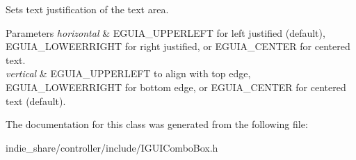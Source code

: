 Sets text justification of the text area. 


\begin{DoxyParams}{Parameters}
{\em horizontal} & E\+G\+U\+I\+A\+\_\+\+U\+P\+P\+E\+R\+L\+E\+FT for left justified (default), E\+G\+U\+I\+A\+\_\+\+L\+O\+W\+E\+E\+R\+R\+I\+G\+HT for right justified, or E\+G\+U\+I\+A\+\_\+\+C\+E\+N\+T\+ER for centered text. \\
\hline
{\em vertical} & E\+G\+U\+I\+A\+\_\+\+U\+P\+P\+E\+R\+L\+E\+FT to align with top edge, E\+G\+U\+I\+A\+\_\+\+L\+O\+W\+E\+E\+R\+R\+I\+G\+HT for bottom edge, or E\+G\+U\+I\+A\+\_\+\+C\+E\+N\+T\+ER for centered text (default). \\
\hline
\end{DoxyParams}


The documentation for this class was generated from the following file\+:\begin{DoxyCompactItemize}
\item 
indie\+\_\+share/controller/include/I\+G\+U\+I\+Combo\+Box.\+h\end{DoxyCompactItemize}
